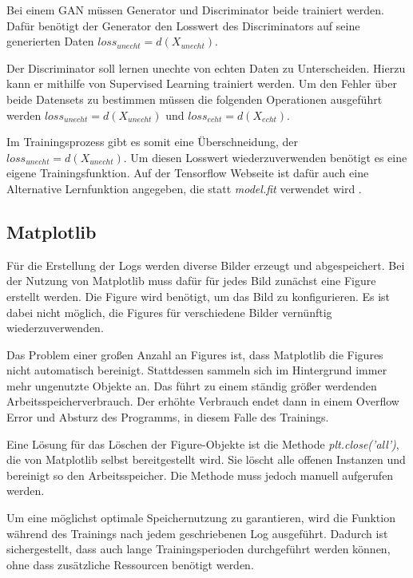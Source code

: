 Bei einem GAN müssen Generator und Discriminator beide trainiert werden.
Dafür benötigt der Generator den Losswert des Discriminators auf seine generierten Daten $loss_{unecht} = d(X_{unecht})$.

Der Discriminator soll lernen unechte von echten Daten zu Unterscheiden.
Hierzu kann er mithilfe von Supervised Learning trainiert werden.
Um den Fehler über beide Datensets zu bestimmen müssen die folgenden Operationen ausgeführt werden $loss_{unecht} = d(X_{unecht})$ und $loss_{echt} = d(X_{echt})$.
\newline

Im Trainingsprozess gibt es somit eine Überschneidung, der $loss_{unecht} = d(X_{unecht})$.
Um diesen Losswert wiederzuverwenden benötigt es eine eigene Trainingsfunktion.
Auf der Tensorflow Webseite ist dafür auch eine Alternative Lernfunktion angegeben, die statt \textit{model.fit} verwendet wird \cite{tensorflow-gan-learn-step}.

\subsection{Matplotlib}
Für die Erstellung der Logs werden diverse Bilder erzeugt und abgespeichert.
Bei der Nutzung von Matplotlib muss dafür für jedes Bild zunächst eine Figure erstellt werden.
Die Figure wird benötigt, um das Bild zu konfigurieren.
Es ist dabei nicht möglich, die Figures für verschiedene Bilder vernünftig wiederzuverwenden.
\newline

Das Problem einer großen Anzahl an Figures ist, dass Matplotlib die Figures nicht automatisch bereinigt.
Stattdessen sammeln sich im Hintergrund immer mehr ungenutzte Objekte an.
Das führt zu einem ständig größer werdenden Arbeitsspeicherverbrauch.
Der erhöhte Verbrauch endet dann in einem Overflow Error und Absturz des Programms, in diesem Falle des Trainings.
\newline

Eine Lösung für das Löschen der Figure-Objekte ist die Methode \textit{plt.close('all')}, die von Matplotlib selbst bereitgestellt wird.
Sie löscht alle offenen Instanzen und bereinigt so den Arbeitsspeicher.
Die Methode muss jedoch manuell aufgerufen werden.
\newline

Um eine möglichst optimale Speichernutzung zu garantieren, wird die Funktion während des Trainings nach jedem geschriebenen Log ausgeführt.
Dadurch ist sichergestellt, dass auch lange Trainingsperioden durchgeführt werden können, ohne dass zusätzliche Ressourcen benötigt werden.

